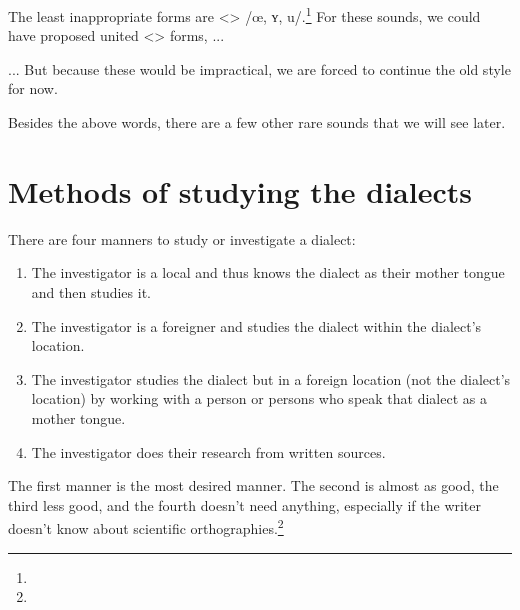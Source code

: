 The least inappropriate forms are <> /œ, ʏ, u/.\footnote{} For these sounds, we could have proposed united <> forms, ... 


\begin{adjarianpage}\label{page:11}\end{adjarianpage}%

... But because these would be impractical, we are forced to continue the old style for now. 

Besides the above words, there are a few other rare sounds that we will see later. 

\section{Methods of studying the dialects}

There are four manners to study or investigate a dialect:
\begin{enumerate}
	\item The investigator is a local and thus knows the dialect as their mother tongue and then studies it. 
	\item The investigator is a foreigner and studies the dialect within the dialect's location. 
	\item The investigator studies the dialect but in a foreign location (not the dialect's location) by working with a person or persons who speak that dialect as a mother tongue. 
	\item The investigator does their research from written sources. 
	
\end{enumerate}

The first manner is the most desired manner. The second is almost as good, the third less good, and the fourth doesn't need anything, especially if the writer doesn't know about scientific orthographies.\footnote{} 

